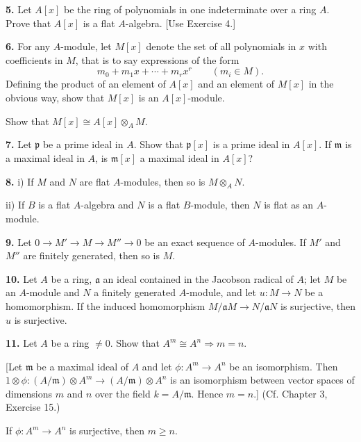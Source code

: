 
\noindent\textbf{5.} Let $A[x]$ be the ring of polynomials in one indeterminate over a ring $A$.  Prove
that $A[x]$ is a flat $A$-algebra.  [Use Exercise 4.]

\medskip
\noindent\textbf{6.} For any $A$-module, let $M[x]$ denote the set of all polynomials in $x$ with coefficients in $M$, that is to say expressions of the form
\[
m_0+m_1x+\cdots+m_rx^r\qquad(m_i\in M).
\]
Defining the product of an element of $A[x]$ and an element of $M[x]$ in the obvious
way, show that $M[x]$ is an $A[x]$-module.

Show that $M[x]\cong A[x]\otimes_A M$.

\medskip
\noindent\textbf{7.} Let $\mathfrak p$ be a prime ideal in $A$.  Show that $\mathfrak p[x]$ is a prime ideal in $A[x]$.  If $\mathfrak m$ is a
maximal ideal in $A$, is $\mathfrak m[x]$ a maximal ideal in $A[x]$?

\medskip
\noindent\amstar\textbf{8.} i) If $M$ and $N$ are flat $A$-modules, then so is $M\otimes_A N$.

ii) If $B$ is a flat $A$-algebra and $N$ is a flat $B$-module, then $N$ is flat as an $A$-module.

\medskip
\noindent\amstar\textbf{9.} Let $0\longrightarrow M'\longrightarrow M\longrightarrow M''\longrightarrow0$ be an exact sequence of $A$-modules.  If $M'$ and
$M''$ are finitely generated, then so is $M$.

\medskip
\noindent\amstar\textbf{10.} Let $A$ be a ring, $\mathfrak a$ an ideal contained in the Jacobson radical of $A$; let $M$ be an
$A$-module and $N$ a finitely generated $A$-module, and let $u:M\longrightarrow N$ be a homomorphism.  If the induced homomorphism $M/\mathfrak aM\longrightarrow N/\mathfrak aN$ is surjective, then
$u$ is surjective.

\medskip
\noindent\textbf{11.} Let $A$ be a ring $\ne0$.  Show that $A^m\cong A^n\Rightarrow m=n$.

[Let $\mathfrak m$ be a maximal ideal of $A$ and let $\phi:A^m\longrightarrow A^n$ be an isomorphism.  Then
$1\otimes\phi:(A/\mathfrak m)\otimes A^m\longrightarrow(A/\mathfrak m)\otimes A^n$ is an isomorphism between vector spaces
of dimensions $m$ and $n$ over the field $k=A/\mathfrak m$.  Hence $m=n$.] (Cf. Chapter 3,
Exercise 15.)

If $\phi:A^m\longrightarrow A^n$ is surjective, then $m\geq n$.

